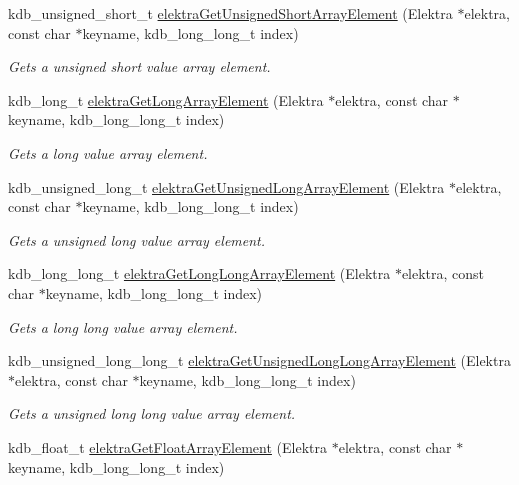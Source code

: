 \begin{DoxyCompactItemize}
kdb\+\_\+unsigned\+\_\+short\+\_\+t \mbox{\hyperlink{group__highlevel_ga6a2f7bae625b970144b49ea42a2d5c00}{elektra\+Get\+Unsigned\+Short\+Array\+Element}} (Elektra $\ast$elektra, const char $\ast$keyname, kdb\+\_\+long\+\_\+long\+\_\+t index)
\begin{DoxyCompactList}\small\item\em Gets a unsigned short value array element. \end{DoxyCompactList}\item 
kdb\+\_\+long\+\_\+t \mbox{\hyperlink{group__highlevel_ga0ac109ad5a0cd4b3c92ee050bc5649b5}{elektra\+Get\+Long\+Array\+Element}} (Elektra $\ast$elektra, const char $\ast$keyname, kdb\+\_\+long\+\_\+long\+\_\+t index)
\begin{DoxyCompactList}\small\item\em Gets a long value array element. \end{DoxyCompactList}\item 
kdb\+\_\+unsigned\+\_\+long\+\_\+t \mbox{\hyperlink{group__highlevel_ga8eb3597a96134c11f5d04a4613c44b92}{elektra\+Get\+Unsigned\+Long\+Array\+Element}} (Elektra $\ast$elektra, const char $\ast$keyname, kdb\+\_\+long\+\_\+long\+\_\+t index)
\begin{DoxyCompactList}\small\item\em Gets a unsigned long value array element. \end{DoxyCompactList}\item 
kdb\+\_\+long\+\_\+long\+\_\+t \mbox{\hyperlink{group__highlevel_gaa55dfc31eaca932f963461eb1a1e1f86}{elektra\+Get\+Long\+Long\+Array\+Element}} (Elektra $\ast$elektra, const char $\ast$keyname, kdb\+\_\+long\+\_\+long\+\_\+t index)
\begin{DoxyCompactList}\small\item\em Gets a long long value array element. \end{DoxyCompactList}\item 
kdb\+\_\+unsigned\+\_\+long\+\_\+long\+\_\+t \mbox{\hyperlink{group__highlevel_ga7fbb3695614f81db6074375d7819479f}{elektra\+Get\+Unsigned\+Long\+Long\+Array\+Element}} (Elektra $\ast$elektra, const char $\ast$keyname, kdb\+\_\+long\+\_\+long\+\_\+t index)
\begin{DoxyCompactList}\small\item\em Gets a unsigned long long value array element. \end{DoxyCompactList}\item 
kdb\+\_\+float\+\_\+t \mbox{\hyperlink{group__highlevel_ga12730b6a7b6e6b0ff462e6dd0c4af69c}{elektra\+Get\+Float\+Array\+Element}} (Elektra $\ast$elektra, const char $\ast$keyname, kdb\+\_\+long\+\_\+long\+\_\+t index)

\end{DoxyCompactItemize}

